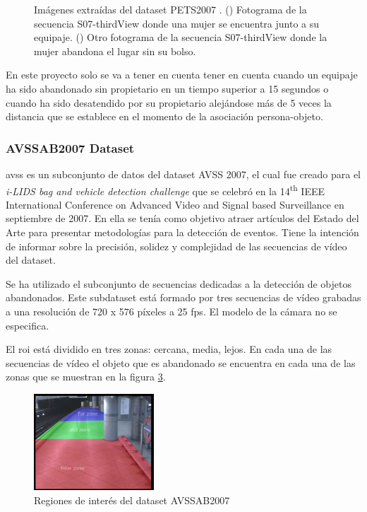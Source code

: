 \begin{figure}[ht]
\begin{subfigure}[b]{0.4\textwidth}
    \caption{}
    \label{fig:pets2007_4}
  \end{subfigure}
  \caption{Imágenes extraídas del dataset PETS2007 \cite{pets2007-dataset}.
    (\protect{}) Fotograma de la secuencia S07-thirdView donde una mujer se encuentra junto a su equipaje.
    (\protect{}) Otro fotograma de la secuencia S07-thirdView donde la mujer abandona el lugar sin su bolso.}
  \label{fig:pets2007_S07}
\end{figure}

En este proyecto solo se va a tener en cuenta tener en cuenta cuando un equipaje ha sido abandonado sin propietario en un tiempo superior a 15 segundos o cuando ha sido desatendido por su propietario alejándose más de 5 veces la distancia que se establece en el momento de la asociación persona-objeto.

\subsubsection{AVSSAB2007 Dataset}

\gls{avss} \cite{AVSSAB2007-dataset} es un subconjunto de datos del dataset AVSS 2007, el cual fue creado para el \textit{i-LIDS bag and vehicle detection challenge} que se celebró en la 14\textsuperscript{th} IEEE International Conference on Advanced Video and Signal based Surveillance en septiembre de 2007. En ella se tenía como objetivo atraer artículos del Estado del Arte para presentar metodologías para la detección de eventos. Tiene la intención de informar sobre la precisión, solidez y complejidad de las secuencias de vídeo del dataset.

Se ha utilizado el subconjunto de secuencias dedicadas a la detección de objetos abandonados. Este subdataset está formado por tres secuencias de vídeo grabadas a una resolución de 720 x 576 píxeles a 25 \gls{fps}. El modelo de la cámara no se especifica.

El \gls{roi} está dividido en tres zonas: cercana, media, lejos. En cada una de las secuencias de vídeo el objeto que es abandonado se encuentra en cada una de las zonas que se muestran en la figura \ref{fig:avssab2007-zones}.

\begin{figure}[ht]
\centering
\includegraphics[width=0.4\textwidth]{img/chapters/resultados/datasets/avssab2007-zones.png}
\caption{\label{fig:avssab2007-zones}Regiones de interés del dataset AVSSAB2007 \cite{AVSSAB2007-dataset}}
\end{figure}

